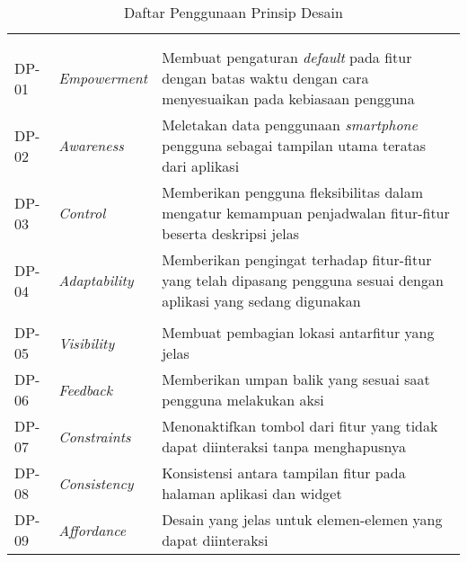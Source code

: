 \RaggedLeft
\begin{footnotesize}
\begin{longtable}[c]{|W{c}{0.07\textwidth}|>{\ccnormspacingcenter}m{0.18\textwidth}|>{\ccnormspacing}m{0.65\textwidth}|}
  \caption{Daftar Penggunaan Prinsip Desain}
  \label{tab:prinsip_desain} \\
  \hline {}
   &  &  \\ \hline \endfirsthead
  \hline {}
   &  &  \\ \hline \endhead

  \hline \endfoot
  
    \\ \hline
  DP-01 & \textit{Empowerment} & Membuat pengaturan \textit{default} pada fitur dengan batas waktu dengan cara menyesuaikan pada kebiasaan pengguna \\ \hline
  DP-02 & \textit{Awareness} & Meletakan data penggunaan \textit{smartphone} pengguna sebagai tampilan utama teratas dari aplikasi \\ \hline
  DP-03 & \textit{Control} & Memberikan pengguna fleksibilitas dalam mengatur kemampuan penjadwalan fitur-fitur beserta deskripsi jelas \\ \hline
  DP-04 & \textit{Adaptability} & Memberikan pengingat terhadap fitur-fitur yang telah dipasang pengguna sesuai dengan aplikasi yang sedang digunakan \\ \hline
    \\ \hline
  DP-05 & \textit{Visibility} & Membuat pembagian lokasi antarfitur yang jelas \\ \hline
  DP-06 & \textit{Feedback} & Memberikan umpan balik yang sesuai saat pengguna melakukan aksi \\ \hline
  DP-07 & \textit{Constraints} & Menonaktifkan tombol dari fitur yang tidak dapat diinteraksi tanpa menghapusnya \\ \hline
  DP-08 & \textit{Consistency} & Konsistensi antara tampilan fitur pada halaman aplikasi dan widget \\ \hline
  DP-09 & \textit{Affordance} & Desain yang jelas untuk elemen-elemen yang dapat diinteraksi \\ \hline

\end{longtable}
\end{footnotesize}
\justifying


